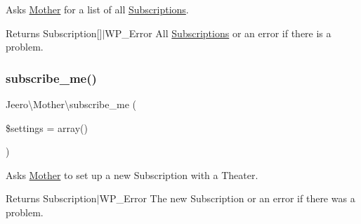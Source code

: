 Asks \hyperlink{namespaceJeero_1_1Mother}{Mother} for a list of all \hyperlink{namespaceJeero_1_1Subscriptions}{Subscriptions}.

\begin{DoxyReturn}{Returns}
Subscription\mbox{[}\mbox{]}$\vert$\+W\+P\+\_\+\+Error All \hyperlink{namespaceJeero_1_1Subscriptions}{Subscriptions} or an error if there is a problem. 
\end{DoxyReturn}
\mbox{\label{namespaceJeero_1_1Mother_a379b77ef6336a987a5359b5b28212259}} 
\subsubsection{\texorpdfstring{subscribe\+\_\+me()}{subscribe\_me()}}
{\footnotesize\ttfamily Jeero\textbackslash{}\+Mother\textbackslash{}subscribe\+\_\+me (\begin{DoxyParamCaption}\item[{}]{\$settings = {\ttfamily array()} }\end{DoxyParamCaption})}

Asks \hyperlink{namespaceJeero_1_1Mother}{Mother} to set up a new Subscription with a Theater.

\begin{DoxyReturn}{Returns}
Subscription$\vert$\+W\+P\+\_\+\+Error The new Subscription or an error if there was a problem. 
\end{DoxyReturn}
